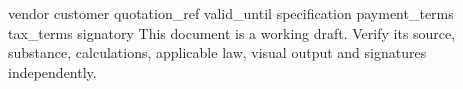 \documentclass[11pt,a4paper]{article}
\begin{document}
{{vendor}}
{{customer}}
{{quotation_ref}}
{{valid_until}}
{{specification}}
{{payment_terms}}
{{tax_terms}}
{{signatory}}
This document is a working draft. Verify its source, substance, calculations, applicable law, visual output and signatures independently.
\end{document}
